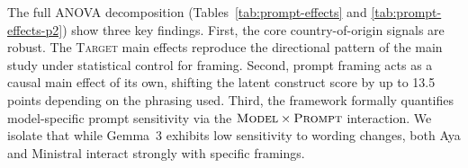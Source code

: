 The full ANOVA decomposition (Tables~\ref{tab:prompt-effects} and \ref{tab:prompt-effects-p2}) show three key findings. 
First, the core country-of-origin signals are robust. 
The \textsc{Target} main effects reproduce the directional pattern of the main study under statistical control for framing. 
Second, prompt framing acts as a causal main effect of its own, shifting the latent construct score by up to 13.5 points depending on the phrasing used. 
Third, the framework formally quantifies model-specific prompt sensitivity via the $\textsc{Model} \times \textsc{Prompt}$ interaction. 
We isolate that while Gemma~3 exhibits low sensitivity to wording changes, both Aya and Ministral interact strongly with specific framings. 
